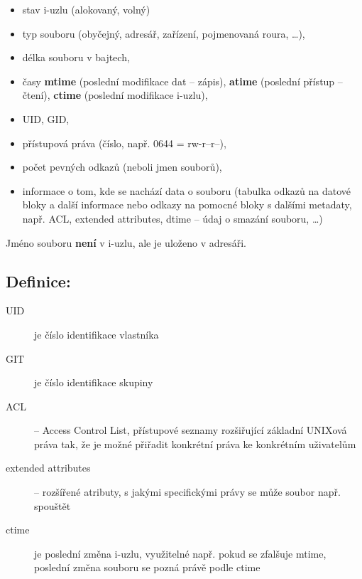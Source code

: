 \documentclass[a4paper, 11pt]{article}
\begin{document}
\begin{itemize}
    \item stav i-uzlu (alokovaný, volný)
    \item typ souboru (obyčejný, adresář, zařízení, pojmenovaná roura, \ldots),
    \item délka souboru v bajtech,
    \item časy \textbf{mtime} (poslední modifikace dat -- zápis), \textbf{atime} (poslední přístup -- čtení), \textbf{ctime} (poslední modifikace i-uzlu),
    \item UID, GID,
    \item přístupová práva (číslo, např. 0644 = rw-r--r--),
    \item počet pevných odkazů (neboli jmen souborů),
    \item informace o tom, kde se nachází data o souboru (tabulka odkazů na datové bloky a další informace nebo odkazy na pomocné bloky s dalšími metadaty, např. ACL, extended attributes, dtime -- údaj o smazání souboru, \ldots)
\end{itemize}

Jméno souboru \textbf{není} v i-uzlu, ale je uloženo v adresáři.

\subsection*{Definice:}
\begin{description}
\item[UID] je číslo identifikace vlastníka
\item[GIT] je číslo identifikace skupiny

\item[ACL] -- Access Control List, přístupové seznamy rozšiřující základní UNIXová práva tak, že je možné přiřadit konkrétní práva ke konkrétním uživatelům

\item[extended attributes] -- rozšířené atributy, s jakými specifickými právy se může soubor např. spouštět

\item[ctime] je poslední změna i-uzlu, využitelné např. pokud se zfalšuje mtime, poslední změna souboru se pozná právě podle ctime
\end{description}
\end{document}
